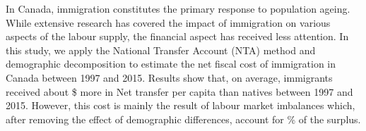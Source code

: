In Canada, immigration constitutes the primary response to population ageing. While extensive research has covered the impact of immigration on various aspects of the labour supply, the financial aspect has received less attention.
In this study, we apply the National Transfer Account (NTA) method and demographic decomposition to estimate the net fiscal cost of immigration in Canada between 1997 and 2015.
Results show that, on average, immigrants received about \$ more in Net transfer per capita than natives between 1997 and 2015.
However, this cost is mainly the result of labour market imbalances which, after removing the effect of demographic differences, account for \% of the surplus.

